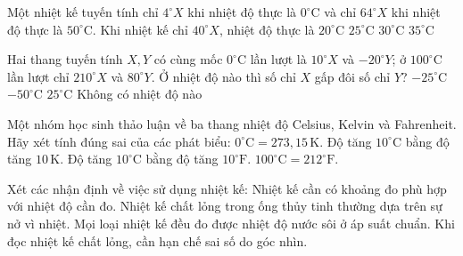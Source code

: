 \begin{ex}
Một nhiệt kế tuyến tính chỉ $4^\circ X$ khi nhiệt độ thực là $0^\circ\mathrm{C}$ và chỉ $64^\circ X$ khi nhiệt độ thực là $50^\circ\mathrm{C}$. Khi nhiệt kế chỉ $40^\circ X$, nhiệt độ thực là
\choice
{$20^\circ\mathrm{C}$}
{$25^\circ\mathrm{C}$}
{\True $30^\circ\mathrm{C}$}
{$35^\circ\mathrm{C}$}
\end{ex}

\begin{ex}
Hai thang tuyến tính $X,Y$ có cùng mốc $0^\circ\mathrm{C}$ lần lượt là $10^\circ X$ và $-20^\circ Y$; ở $100^\circ\mathrm{C}$ lần lượt chỉ $210^\circ X$ và $80^\circ Y$. Ở nhiệt độ nào thì số chỉ $X$ gấp đôi số chỉ $Y$?
\choice
{$-25^\circ\mathrm{C}$}
{$-50^\circ\mathrm{C}$}
{$25^\circ\mathrm{C}$}
{\True Không có nhiệt độ nào}
\end{ex}

\begin{ex}
Một nhóm học sinh thảo luận về ba thang nhiệt độ Celsius, Kelvin và Fahrenheit. Hãy xét tính đúng sai của các phát biểu:
\choiceTF
{\True $0^\circ\mathrm{C}=273{,}15\,\mathrm{K}$.}
{\True Độ tăng $10^\circ\mathrm{C}$ bằng độ tăng $10\,\mathrm{K}$.}
{Độ tăng $10^\circ\mathrm{C}$ bằng độ tăng $10^\circ\mathrm{F}$.}
{\True $100^\circ\mathrm{C}=212^\circ\mathrm{F}$.}
\end{ex}

\begin{ex}
Xét các nhận định về việc sử dụng nhiệt kế:
\choiceTF
{\True Nhiệt kế cần có khoảng đo phù hợp với nhiệt độ cần đo.}
{\True Nhiệt kế chất lỏng trong ống thủy tinh thường dựa trên sự nở vì nhiệt.}
{Mọi loại nhiệt kế đều đo được nhiệt độ nước sôi ở áp suất chuẩn.}
{\True Khi đọc nhiệt kế chất lỏng, cần hạn chế sai số do góc nhìn.}
\end{ex}

